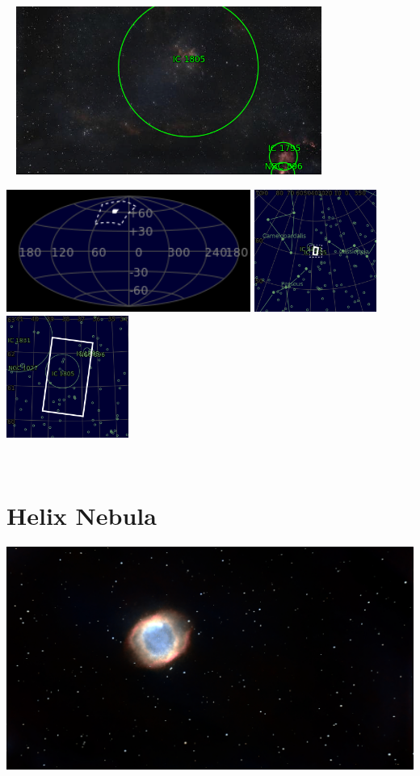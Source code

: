 \begin{center}
 \ \newpage
\includegraphics[width=0.75\textwidth]{../Imaging//Annotated/Heart_Nebula_Annotated.jpg}

\includegraphics[height=4cm]{../Imaging//Annotated/Heart_Nebula_Globe.jpg}
\includegraphics[height=4cm]{../Imaging//Annotated/Heart_Nebula_Close.jpg}
\includegraphics[height=4cm]{../Imaging//Annotated/Heart_Nebula_Closer.jpg}
\end{center}
\ \\\section{Helix Nebula}
\includegraphics[width=\textwidth]{../Imaging//Original/Helix_Nebula.jpg}
